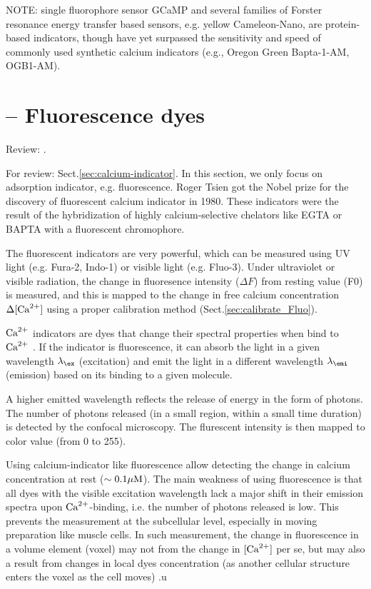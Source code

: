 NOTE: single fluorophore sensor GCaMP and several families of Forster resonance
energy transfer based sensors, e.g. yellow Cameleon-Nano, are protein-based
indicators, though have yet surpassed the sensitivity and speed of commonly used
synthetic calcium indicators (e.g., Oregon Green Bapta-1-AM, OGB1-AM).

\section{-- Fluorescence dyes }
\label{sec:fluorescence-dyes}

Review: \citep{paredes2008}.



For review: Sect.\ref{sec:calcium-indicator}. In this section, we only focus on
adsorption indicator, e.g. fluorescence. 
Roger Tsien got the Nobel prize for the discovery of fluorescent calcium
indicator in 1980. These indicators were the result of the hybridization of
highly calcium-selective chelators like EGTA or BAPTA with a fluorescent
chromophore.  

The  fluorescent indicators are very powerful, which can be measured using UV
light (e.g. Fura-2, Indo-1) or visible light (e.g. Fluo-3).
Under ultraviolet or visible radiation, the change in fluoresence intensity
($\Delta F$) from resting value (F0) is measured, and this is mapped to the
change in free calcium concentration $\Delta [{\text{Ca}^{2+}}]$ using a proper calibration
method (Sect.\ref{sec:calibrate_Fluo}).

\begin{framed}
${\text{Ca}^{2+}}$ indicators are dyes that change their spectral
 properties when bind to ${\text{Ca}^{2+}}$ \citep{takahashi1999}. If the indicator is
 fluorescence, it can absorb the light in a given wavelength $\lambda_\ex$
 (excitation) and emit the light in a different wavelength $\lambda_\emi$
 (emission) based on its binding  to a given molecule.
 
A higher emitted wavelength reflects the release of  energy in the form of
photons. The number  of photons released (in a small region, within a small time
duration) is detected by the confocal microscopy.
 The flurescent intensity is then mapped to color value (from 0 to 255).
 \end{framed}

Using calcium-indicator like fluorescence allow detecting the change in calcium
concentration at rest ($\sim 0.1{\mu\text{M}}$).
The main weakness of using fluorescence is that all dyes with the visible
excitation wavelength lack a major shift in their emission spectra upon
${\text{Ca}^{2+}}$-binding, i.e. the  number of photons released is low. This prevents the
measurement at the  subcellular level, especially in moving preparation like
muscle cells. In such  measurement, the change in fluorescence in a volume
element (voxel) may not  from the change in $[{\text{Ca}^{2+}}]$ per se, but may also a
result from changes in local  dyes concentration (as another cellular structure
enters the voxel as the cell moves) \citep{lipp1994}.u

